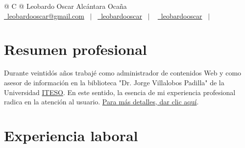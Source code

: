 \documentclass[a4paper,12pt]{article}
\begin{document}
\pagestyle{empty} 



\begin{tabularx}{\linewidth}{@{} C @{}}
\Huge{Leobardo Oscar Alcántara Ocaña} \\[7.5pt]
\href{mailto:leobardooscar@gmail.com}{\raisebox{-0.05\height}\faEnvelope \ leobardooscar@gmail.com} \ $|$ \ 
\href{https://github.com/leobardooscar}{\raisebox{-0.05\height}\faGithub\ leobardooscar} \ $|$ \ 
\href{https://linktr.ee/leobardooscar}{\raisebox{-0.05\height}\faGlobe \ leobardooscar} \ $|$ \ 
\end{tabularx}


\section{Resumen profesional}
Durante veintidós años trabajé como administrador de contenidos Web y como asesor de información en la biblioteca "Dr. Jorge Villalobos Padilla" de la Universidad \href{https://leobardooscar.github.io/portfolio/}{ITESO}. 
En este sentido, la esencia de mi experiencia profesional radica en la atención al usuario.  \href{https://leobardooscar.github.io/portfolio/}{Para más detalles, dar clic aquí}.

\section{Experiencia laboral}
\end{document}
